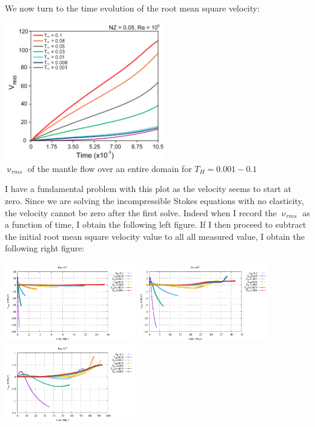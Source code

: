\newpage
We now turn to the time evolution of the root mean square velocity:
\begin{center}
\includegraphics[width=7cm]{python_codes/fieldstone_168/images/kiso20e.jpg}\\
{\captionfont $\upnu_{rms}$ of the mantle flow over an entire domain 
for $T_H=0.001-0.1$}
\end{center}
I have a fundamental problem with this plot as the velocity seems to 
start at zero. Since we are solving the incompressible Stokes 
equations with no elasticity, the velocity cannot be zero after the 
first solve.
Indeed when I record the $\upnu_{rms}$ as a function of time, 
I obtain the following left figure. If I then proceed to subtract the 
initial root mean square velocity value to all all measured value, I 
obtain the following right figure:


\begin{center}
\includegraphics[width=5.7cm]{python_codes/fieldstone_168/results/vrms_1e6.pdf}
\includegraphics[width=5.7cm]{python_codes/fieldstone_168/results/vrms_1e7.pdf}
\includegraphics[width=5.7cm]{python_codes/fieldstone_168/results/vrms_1e8.pdf}
\end{center}






